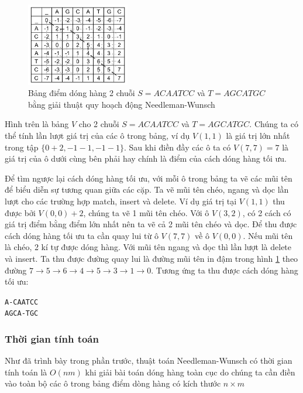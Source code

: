 \begin{figure}[H] %
    \centering %
    \includegraphics[width=0.4\textwidth]{./assets/dp.png} 
    \caption{Bảng điểm dóng hàng 2 chuỗi $S = ACAATCC$ và $T = AGCATGC$
    bằng giải thuật quy hoạch động Needleman-Wunsch} %
    \label{fig:dp_track}
\end{figure}

Hình trên là bảng $V$ cho 2 chuỗi $S = ACAATCC$ và $T = AGCATGC$.
Chúng ta có thể tính lần lượt giá trị của các ô trong bảng, ví dụ $V(1, 1)$ là giá trị 
lớn nhất trong tập $\{0+2, -1-1, -1-1\}$. Sau khi điền đầy các ô ta có $V(7,7) = 7$ là 
giá trị của ô dưới cùng bên phải hay chính là điểm của cách dóng hàng tối ưu.

Để tìm ngược lại cách dóng hàng tối ưu, với mỗi ô trong bảng ta vẽ các mũi tên để biểu 
diễn sự tương quan giữa các cặp. Ta vẽ mũi tên chéo, ngang và dọc lần lượt cho các trường
hợp match, insert và delete. Ví dụ giá trị tại $V(1,1)$ thu được bởi $V(0,0) + 2$, chúng 
ta vẽ 1 mũi tên chéo. Với ô $V(3,2)$, có 2 cách có giá trị điểm bằng điểm lớn nhất nên 
ta vẽ cả 2 mũi tên chéo và dọc. Để thu được cách dóng hàng tối ưu ta cần quay lui từ ô 
$V(7,7)$ về ô $V(0,0)$. Nếu mũi tên là chéo, 2 kí tự được dóng hàng. Với mũi tên ngang và
dọc thì lần lượt là delete và insert. Ta thu được đường quay lui là đường mũi tên in đậm 
trong hình \ref{fig:dp_track} theo đường $7 \to 5 \to 6 \to 4 \to 5 \to 3 \to 1 \to 0$.
Tương ứng ta thu được cách dóng hàng tối ưu:

\begin{center}
    \lstinline{A-CAATCC} \\
    \lstinline{AGCA-TGC}
\end{center}

\subsubsection{Thời gian tính toán}
Như đã trình bày trong phần trước, thuật toán Needleman-Wunsch có thời gian tính toán là $O(nm)$
khi giải bài toán dóng hàng toàn cục do chúng ta cần điền vào toàn bộ các ô trong bảng điểm 
dòng hàng có kích thước $n \times m$

  